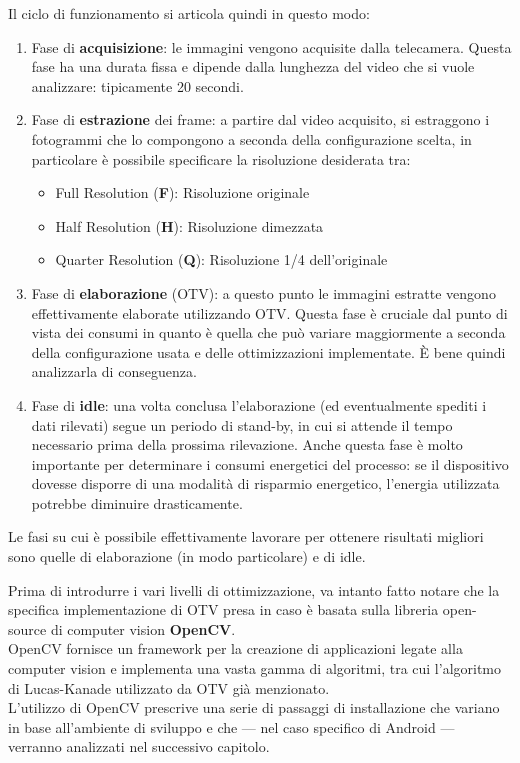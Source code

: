 Il ciclo di funzionamento si articola quindi in questo modo:
\begin{enumerate}
    \item Fase di \textbf{acquisizione}: le immagini vengono acquisite dalla telecamera. Questa fase ha una durata fissa e dipende
    dalla lunghezza del video che si vuole analizzare: tipicamente 20 secondi.
    \item Fase di \textbf{estrazione} dei frame: a partire dal video acquisito, si estraggono i fotogrammi che lo compongono a seconda
    della configurazione scelta, in particolare è possibile specificare la risoluzione desiderata tra:
    \begin{itemize}
        \item Full Resolution (\textbf{F}): Risoluzione originale
        \item Half Resolution (\textbf{H}): Risoluzione dimezzata
        \item Quarter Resolution (\textbf{Q}): Risoluzione 1/4 dell'originale
    \end{itemize}
    \item Fase di \textbf{elaborazione} (OTV): a questo punto le immagini estratte vengono effettivamente elaborate utilizzando
    OTV. Questa fase è cruciale dal punto di vista dei consumi in quanto è quella che può variare maggiormente a seconda della
    configurazione usata e delle ottimizzazioni implementate. È bene quindi analizzarla di conseguenza.
    \item Fase di \textbf{idle}: una volta conclusa l'elaborazione (ed eventualmente spediti i dati rilevati) segue un periodo di stand-by,
    in cui si attende il tempo necessario prima della prossima rilevazione. Anche questa fase è molto importante per determinare
    i consumi energetici del processo: se il dispositivo dovesse disporre di una modalità di risparmio energetico, 
    l'energia utilizzata potrebbe diminuire drasticamente.
\end{enumerate}

Le fasi su cui è possibile effettivamente lavorare per ottenere risultati migliori sono quelle di elaborazione (in modo particolare)
e di idle.


Prima di introdurre i vari livelli di ottimizzazione, va intanto fatto notare che la specifica implementazione di OTV presa in
caso è basata sulla libreria open-source di computer vision \textbf{OpenCV}.\\
OpenCV fornisce un framework per la creazione di applicazioni legate alla computer vision e implementa una vasta gamma di
algoritmi, tra cui l'algoritmo di Lucas-Kanade utilizzato da OTV già menzionato.\\
L'utilizzo di OpenCV prescrive una serie di passaggi di installazione che variano in base all'ambiente di sviluppo e che
--- nel caso specifico di Android --- verranno analizzati nel successivo capitolo.


